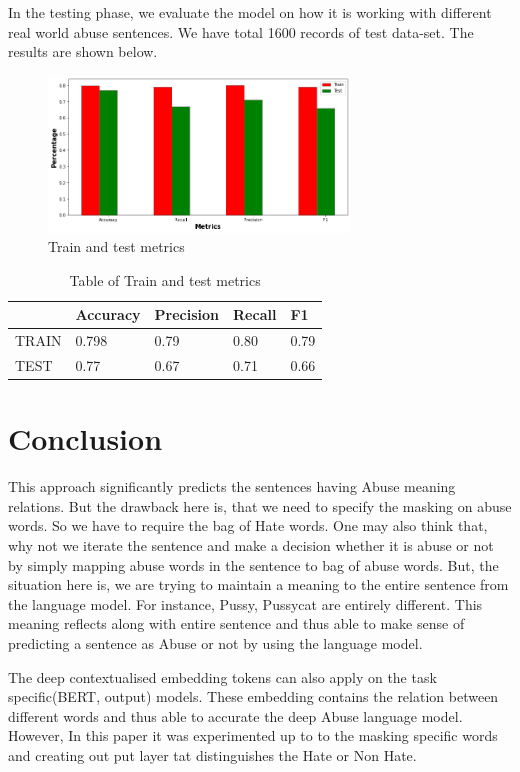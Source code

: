 \documentclass{article}
\begin{document}
In the testing phase, we evaluate the model on how it is working with different real world abuse sentences.  We have total 1600 records of test data-set. The results are shown below.
\begin{figure}[h]
\includegraphics[width=8cm]{images/download.png}
\caption{Train and test metrics}
\label{fig:GraphFig}
\end{figure}
\begin{table}[h]
\vline\vline
\begin{tabular}{|l|l|l|l|l|}
\hline
      & Accuracy & Precision & Recall & F1   \\ \hline
TRAIN & 0.798    & 0.79      & 0.80   & 0.79 \\ \hline
TEST  & 0.77     & 0.67      & 0.71   & 0.66 \\ \hline
\end{tabular}
\caption{Table of Train and test metrics}
\end{table}

\section{Conclusion}
This approach significantly predicts the sentences having Abuse meaning relations. But the drawback here is, that we need to specify the masking on abuse words. So we have to require the bag of Hate words. One may also think that, why not we iterate the sentence and make a decision whether it is abuse or not by simply mapping abuse words in the sentence to bag of abuse words. But, the situation here is, we are trying to maintain a meaning to the entire sentence from the language model. For instance, Pussy, Pussycat are entirely different. This meaning reflects along with entire sentence and thus able to make sense of predicting a sentence as Abuse or not by using the language model.

The deep contextualised embedding tokens can also apply on the task specific(BERT, output) models. These embedding contains the relation between different words and thus able to accurate the deep Abuse language model. However, In this paper it was experimented up to to the masking specific words and creating out put layer tat distinguishes the Hate or Non Hate.
\end{document}
